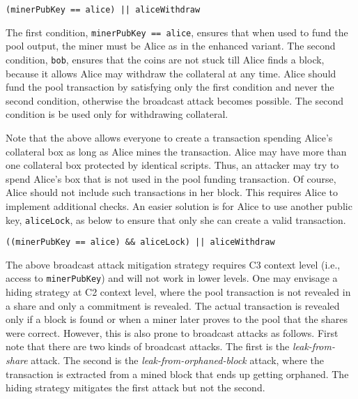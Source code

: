 \documentclass{llncs}
\begin{document}
\begin{verbatim}
(minerPubKey == alice) || aliceWithdraw
\end{verbatim}

The first condition, \texttt{minerPubKey == alice}, ensures that when used to fund the pool output, the miner must be Alice as in the enhanced variant. The second condition, \texttt{bob}, ensures that the coins are not stuck till Alice finds a block, because it allows Alice may withdraw the collateral at any time.
Alice should fund the pool transaction by satisfying only the first condition and never the second condition, otherwise the broadcast attack becomes possible. The second condition is be used only for withdrawing collateral.

Note that the above allows everyone to create a transaction spending Alice's collateral box as long as Alice mines the transaction. Alice may have more than one collateral box protected by identical scripts. Thus, an attacker may try to spend Alice's box that is not used in the pool funding transaction. Of course, Alice should not include such transactions in her block. This requires Alice to implement additional checks. An easier solution is for Alice to use another public key, \texttt{aliceLock}, as below to ensure that only she can create a valid transaction. 

\begin{verbatim}
((minerPubKey == alice) && aliceLock) || aliceWithdraw
\end{verbatim}

The above broadcast attack mitigation strategy requires C3 context level (i.e., access to \texttt{minerPubKey}) and will not work in lower levels. One may envisage a hiding strategy at C2 context level, where the pool transaction is not revealed in a share and only a commitment is revealed. The actual transaction is revealed only if a block is found or when a miner later proves to the pool that the shares were correct. However, this is also prone to broadcast attacks as follows. First note that there are two kinds of broadcast attacks. The first is the {\em leak-from-share} attack. The second is the {\em leak-from-orphaned-block} attack, where the transaction is extracted from a mined block that ends up getting orphaned. The hiding strategy mitigates the first attack but not the second. 
\end{document}
